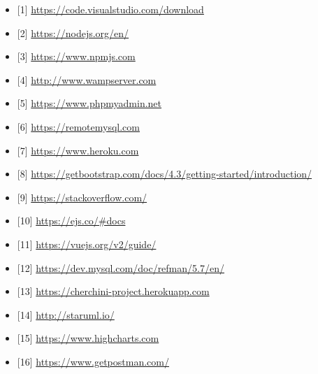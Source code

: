 \begin{itemize}
  \item {[1]  \url{https://code.visualstudio.com/download }  }
  \item { [2]  \url{https://nodejs.org/en/ }  }
  \item {  [3]  \url{https://www.npmjs.com} }
  \item {  [4]  \url{http://www.wampserver.com}}
  \item {  [5]  \url{https://www.phpmyadmin.net}  }
  \item {  [6]  \url{https://remotemysql.com}  }
  \item {  [7]  \url{https://www.heroku.com}  }
  \item { [8]  \url{https://getbootstrap.com/docs/4.3/getting-started/introduction/}   }
  \item { [9]  \url{https://stackoverflow.com/} }
  \item {  [10] \url{https://ejs.co/#docs} }
  \item {  [11] \url{https://vuejs.org/v2/guide/} }
  \item {  [12] \url{https://dev.mysql.com/doc/refman/5.7/en/}  }
  \item {   [13] \url{https://cherchini-project.herokuapp.com} }
  \item {   [14] \url{http://staruml.io/}  }
  \item {   [15] \url{https://www.highcharts.com}  }
  \item {  [16] \url{https://www.getpostman.com/} }
 \end{itemize} 